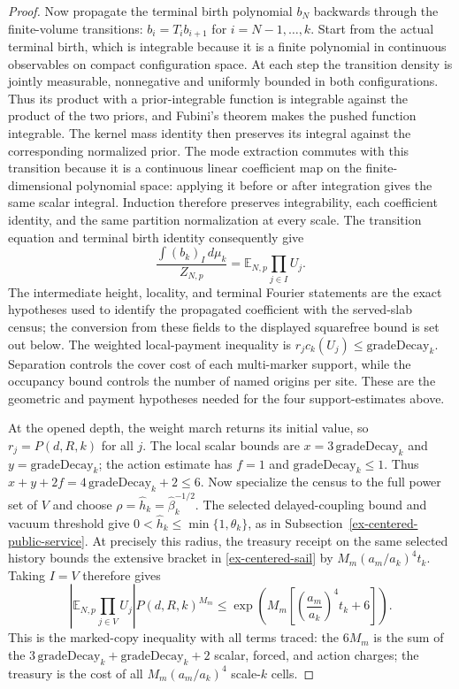 \begin{proof}
Now propagate the terminal birth polynomial $b_N$ backwards through the finite-volume transitions: $b_i=T_i b_{i+1}$ for $i=N-1,\ldots,k$. Start from the actual terminal birth, which is integrable because it is a finite polynomial in continuous observables on compact configuration space. At each step the transition density is jointly measurable, nonnegative and uniformly bounded in both configurations. Thus its product with a prior-integrable function is integrable against the product of the two priors, and Fubini's theorem makes the pushed function integrable. The kernel mass identity then preserves its integral against the corresponding normalized prior. The mode extraction commutes with this transition because it is a continuous linear coefficient map on the finite-dimensional polynomial space: applying it before or after integration gives the same scalar integral. Induction therefore preserves integrability, each coefficient identity, and the same partition normalization at every scale. The transition equation and terminal birth identity consequently give
\[
 \frac{\int (b_k)_I\,d\mu_k}{Z_{N,p}}
   =\mathbb E_{N,p}\prod_{j\in I}U_j.
\]
The intermediate height, locality, and terminal Fourier statements are the exact hypotheses used to identify the propagated coefficient with the served-slab census; the conversion from these fields to the displayed squarefree bound is set out below. The weighted local-payment inequality is $r_j c_k(U_j)\leq\mathrm{gradeDecay}_k$. Separation controls the cover cost of each multi-marker support, while the occupancy bound controls the number of named origins per site. These are the geometric and payment hypotheses needed for the four support-estimates above.

At the opened depth, the weight march returns its initial value, so $r_j=P(d,R,k)$ for all $j$. The local scalar bounds are $x=3\,\mathrm{gradeDecay}_k$ and $y=\mathrm{gradeDecay}_k$; the action estimate has $f=1$ and $\mathrm{gradeDecay}_k\leq1$. Thus $x+y+2f=4\,\mathrm{gradeDecay}_k+2\leq6$. Now specialize the census to the full power set of $V$ and choose $\rho=\widehat h_k=\widehat\beta_k^{-1/2}$. The selected delayed-coupling bound and vacuum threshold give $0<\widehat h_k\leq\min\{1,\theta_k\}$, as in Subsection~\ref{ex-centered-public-service}. At precisely this radius, the treasury receipt on the same selected history bounds the extensive bracket in \eqref{ex-centered-sail} by $M_m(a_m/a_k)^4t_k$. Taking $I=V$ therefore gives
\begin{equation}\label{ex-centered-marked-copy}
 \left|\mathbb E_{N,p}\prod_{j\in V}U_j\right| P(d,R,k)^{M_m}
 \leq \exp\!\left(M_m\left[\left(\frac{a_m}{a_k}\right)^4t_k+6\right]\right).
\end{equation}
This is the marked-copy inequality with all terms traced: the $6M_m$ is the sum of the $3\,\mathrm{gradeDecay}_k+\mathrm{gradeDecay}_k+2$ scalar, forced, and action charges; the treasury is the cost of all $M_m(a_m/a_k)^4$ scale-$k$ cells.


\end{proof}
